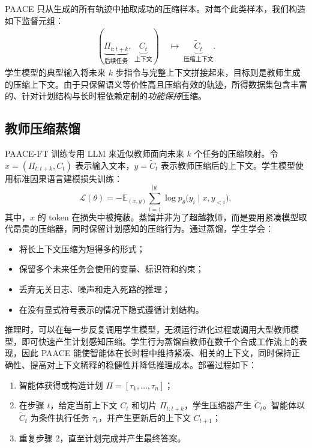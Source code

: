 \documentclass[10pt,twocolumn]{article}
\begin{document}
PAACE 只从生成的所有轨迹中抽取成功的压缩样本。对每个此类样本，我们构造如下监督元组：
\begin{equation}
\begin{aligned}
(\underbrace{\Pi_{t:t+k}}_{\text{后续任务}},\;
\underbrace{C_t}_{\text{上下文}})
&\;\mapsto\;
\underbrace{\tilde{C}_t}_{\text{压缩上下文}}.
\end{aligned}
\end{equation}
学生模型的典型输入将未来 $k$ 步指令与完整上下文拼接起来，目标则是教师生成的压缩上下文。由于只保留语义等价性高且压缩有效的轨迹，所得数据集包含丰富的、针对计划结构与长时程依赖定制的\emph{功能保持}压缩。

\subsection{教师压缩蒸馏}

PAACE-FT 训练专用 LLM 来近似教师面向未来 $k$ 个任务的压缩映射。令 $x=(\Pi_{t:t+k},C_t)$ 表示输入文本，$y=\tilde{C}_t$ 表示教师压缩后的上下文。学生模型使用标准因果语言建模损失训练：
\begin{equation}
\mathcal{L}(\theta)=-\mathbb{E}_{(x,y)}
\sum_{i=1}^{|y|}\log p_\theta\bigl(y_i\mid x,y_{<i}\bigr),
\end{equation}
其中，$x$ 的 token 在损失中被掩蔽。蒸馏并非为了超越教师，而是要用紧凑模型取代昂贵的压缩器，同时保留计划感知的压缩行为。通过蒸馏，学生学会：
\begin{itemize}
  \item 将长上下文压缩为短得多的形式；
  \item 保留多个未来任务会使用的变量、标识符和约束；
  \item 丢弃无关日志、噪声和走入死路的推理；
  \item 在没有显式符号表示的情况下隐式遵循计划结构。
\end{itemize}

推理时，可以在每一步反复调用学生模型，无须运行进化过程或调用大型教师模型，即可快速产生计划感知压缩。学生行为蒸馏自教师在数千个合成工作流上的表现，因此 PAACE 能使智能体在长时程中维持紧凑、相关的上下文，同时保持正确性、提高对上下文稀释的稳健性并降低推理成本。部署过程如下：
\begin{enumerate}
  \item 智能体获得或构造计划 $\Pi=[\tau_1,\dots,\tau_n]$；
  \item 在步骤 $t$，给定当前上下文 $C_t$ 和切片 $\Pi_{t:t+k}$，学生压缩器产生 $\tilde{C}_t$。智能体以 $\tilde{C}_t$ 为条件执行任务 $\tau_t$，并产生更新后的上下文 $C_{t+1}$；
  \item 重复步骤 2，直至计划完成并产生最终答案。
\end{enumerate}
\end{document}
